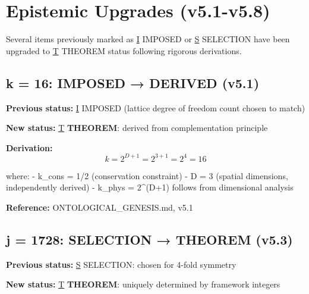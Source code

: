 \documentclass[
  11pt,
  letterpaper,
  twoside,
  openright]{book}
\begin{document}
\section{Epistemic Upgrades (v5.1-v5.8)}\label{sec-epistemic-upgrades}

\begin{tcolorbox}[enhanced jigsaw, coltitle=black, colbacktitle=quarto-callout-important-color!10!white, toprule=.15mm, colframe=quarto-callout-important-color-frame, arc=.35mm, opacityback=0, bottomtitle=1mm, toptitle=1mm, breakable, colback=white, titlerule=0mm, opacitybacktitle=0.6, title=\textcolor{quarto-callout-important-color}{\faExclamation}\hspace{0.5em}{Status Changes January 2026}, rightrule=.15mm, bottomrule=.15mm, leftrule=.75mm, left=2mm]

Several items previously marked as \hyperref[i]{I} IMPOSED or
\hyperref[s]{S} SELECTION have been upgraded to \hyperref[t]{T} THEOREM
status following rigorous derivations.

\end{tcolorbox}

\subsection{k = 16: IMPOSED → DERIVED
(v5.1)}\label{k-16-imposed-derived-v5.1}

\textbf{Previous status:} \hyperref[i]{I} IMPOSED (lattice degree of
freedom count chosen to match)

\textbf{New status:} \hyperref[t]{T} \textbf{THEOREM}: derived from
complementation principle

\textbf{Derivation:} \[k = 2^{D+1} = 2^{3+1} = 2^4 = 16\]

where: - k\_cons = 1/2 (conservation constraint) - D = 3 (spatial
dimensions, independently derived) - k\_phys = 2\^{}(D+1) follows from
dimensional analysis

\textbf{Reference:} ONTOLOGICAL\_GENESIS.md, v5.1

\subsection{j = 1728: SELECTION → THEOREM
(v5.3)}\label{j-1728-selection-theorem-v5.3}

\textbf{Previous status:} \hyperref[s]{S} SELECTION: chosen for 4-fold
symmetry

\textbf{New status:} \hyperref[t]{T} \textbf{THEOREM}: uniquely
determined by framework integers
\end{document}

